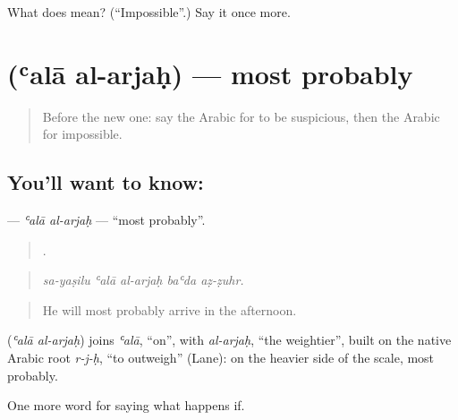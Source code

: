 \begin{tcolorbox}[breakable,colback=teal!4,colframe=teal!35!black,title={Before you move on}]
What does  mean? (\textquotedblleft{}Impossible\textquotedblright{}.) Say it once more.
\end{tcolorbox}
\section[\texorpdfstring{\ar{على} \ar{الأرجح} (ʿalā al-arjaḥ)}{على الأرجح (ʿalā al-arjaḥ)}]{  (ʿalā al-arjaḥ) — most probably}

\label{lesson:AR-C403-ala-al-arjah}



\begin{quote}
Before the new one: say the Arabic for to be suspicious, then the Arabic for impossible.
\end{quote}

\subsection*{You'll want to know:  }
\textbf{ } — \emph{ʿalā al-arjaḥ} — \textquotedblleft{}most probably\textquotedblright{}.

\begin{quote}
    .
\end{quote}

\begin{quote}
\emph{sa-yaṣilu ʿalā al-arjaḥ baʿda aẓ-ẓuhr.}
\end{quote}

\begin{quote}
He will most probably arrive in the afternoon.
\end{quote}

\begin{cousinweb}
\textbf{ } (\emph{ʿalā al-arjaḥ}) joins \emph{ʿalā}, \textquotedblleft{}on\textquotedblright{}, with \emph{al-arjaḥ}, \textquotedblleft{}the weightier\textquotedblright{}, built on the native Arabic root \emph{r-j-ḥ}, \textquotedblleft{}to outweigh\textquotedblright{} (Lane): on the heavier side of the scale, most probably.
\end{cousinweb}

\begin{grammarlens}[title={What you've built}]
One more word for saying what happens if.
\end{grammarlens}


